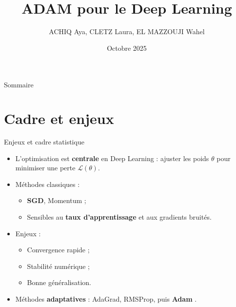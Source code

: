 \documentclass{beamer}
\title{ADAM pour le Deep Learning}
\author{ACHIQ Aya, CLETZ Laura, EL MAZZOUJI Wahel}
\date{\footnotesize Octobre 2025}
\begin{document}
\begin{frame}

  \titlepage

\end{frame}

\begin{frame}{Sommaire}

  \tableofcontents

\end{frame}
\section{Cadre et enjeux}

\begin{frame}{Enjeux et cadre statistique}

\begin{itemize}
  \item L’optimisation est \textbf{centrale} en Deep Learning :
        ajuster les poids $\theta$ pour minimiser une perte $\mathcal{L}(\theta)$.
  \medskip
  \item Méthodes classiques :
        \begin{itemize}
          \item \textbf{SGD}, Momentum ;
          \item Sensibles au \textbf{taux d’apprentissage} et aux gradients bruités.
        \end{itemize}
  \medskip
  \item Enjeux :
        \begin{itemize}
          \item Convergence rapide ;
          \item Stabilité numérique ;
          \item Bonne généralisation.
        \end{itemize}
  \medskip
  \item Méthodes \textbf{adaptatives} :
        AdaGrad, RMSProp, puis \textbf{Adam} \cite{kingma2014}.
\end{itemize}

\end{frame}

\end{document}
